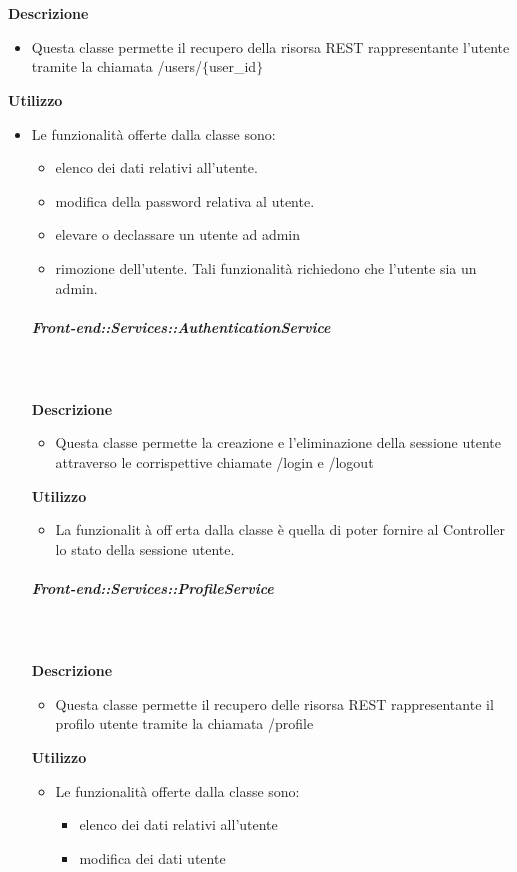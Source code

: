         \textbf{\\ \\ Descrizione} 
          \begin{itemize}
            \item[] Questa classe permette il recupero della risorsa REST rappresentante l'utente tramite la chiamata /users/$\{$user_id$\}$
          \end{itemize}      
        \textbf{Utilizzo}  
          \begin{itemize}
            \item[] Le funzionalità offerte dalla classe sono: 
\begin{itemize} 
\item elenco dei dati relativi all'utente. 
\item modifica della password relativa al utente.
\item elevare o declassare un utente ad admin 
\item rimozione dell'utente. 
Tali funzionalità richiedono che l'utente sia un admin.
          \end{itemize}
      \subparagraph{Front-end::Services::AuthenticationService}
        
        \textbf{\\ \\ Descrizione} 
          \begin{itemize}
            \item[] Questa classe permette la creazione e l'eliminazione della sessione utente attraverso le corrispettive chiamate /login e /logout
          \end{itemize}      
        \textbf{Utilizzo}  
          \begin{itemize}
            \item[] La funzionalità offerta dalla classe è quella di poter fornire al Controller lo stato della sessione utente.
          \end{itemize}
      \subparagraph{Front-end::Services::ProfileService}
        
        \textbf{\\ \\ Descrizione} 
          \begin{itemize}
            \item[] Questa classe permette il recupero delle risorsa REST rappresentante il profilo utente tramite la chiamata /profile
          \end{itemize}      
        \textbf{Utilizzo}  
          \begin{itemize}
            \item[] Le funzionalità offerte dalla classe sono:
\begin{itemize}
\item elenco dei dati relativi all'utente
\item modifica dei dati utente
\end{itemize}


\end{itemize}
\end{itemize}
